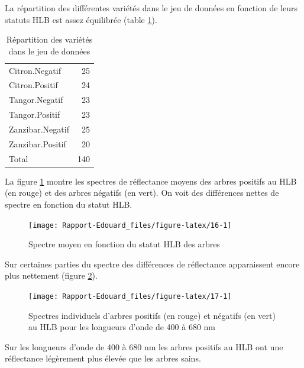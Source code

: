 \documentclass[
  11pt,
  french,
  a4paper,
  extrafontsizes,onecolumn,openright
  ]{memoir}
\begin{document}
La répartition des différentes variétés dans le jeu de données en fonction de leurs statuts HLB est assez équilibrée (table \ref{tab:T1}).

\scriptsize

\begin{longtable}[t]{lr}
\caption{\label{tab:T1}Répartition des variétés dans le jeu de données}\\
\toprule
Citron.Negatif & 25\\
Citron.Positif & 24\\
Tangor.Negatif & 23\\
Tangor.Positif & 23\\
Zanzibar.Negatif & 25\\
\addlinespace
Zanzibar.Positif & 20\\
Total & 140\\
\bottomrule
\end{longtable}

\normalsize

La figure \ref{fig:16} montre les spectres de réflectance moyens des arbres positifs au HLB (en rouge) et des arbres négatifs (en vert). On voit des différences nettes de spectre en fonction du statut HLB.

\scriptsize

\begin{figure}

{\centering \texttt{[image: Rapport-Edouard\_files/figure-latex/16-1]} 

}

\caption{Spectre moyen en fonction du statut HLB des arbres}\label{fig:16}
\end{figure}

\normalsize

Sur certaines parties du spectre des différences de réflectance apparaissent encore plus nettement (figure \ref{fig:17}).

\scriptsize

\begin{figure}

{\centering \texttt{[image: Rapport-Edouard\_files/figure-latex/17-1]} 

}

\caption{Spectres individuels d’arbres positifs (en rouge) et négatifs (en vert) au HLB pour les longueurs d'onde de 400 à 680 nm}\label{fig:17}
\end{figure}

\normalsize

Sur les longueurs d'onde de 400 à 680 nm les arbres positifs au HLB ont une réflectance légèrement plus élevée que les arbres sains.
\end{document}
